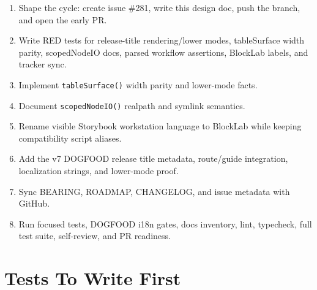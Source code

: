 \begin{enumerate}
\def\labelenumi{\arabic{enumi}.}
\tightlist
\item
  Shape the cycle: create issue \#281, write this design doc, push the branch, and open the early PR.
\item
  Write RED tests for release-title rendering/lower modes, tableSurface width parity, scopedNodeIO docs, parsed workflow assertions, BlockLab labels, and tracker sync.
\item
  Implement \texttt{t\allowbreak{}a\allowbreak{}b\allowbreak{}l\allowbreak{}e\allowbreak{}S\allowbreak{}u\allowbreak{}r\allowbreak{}f\allowbreak{}a\allowbreak{}c\allowbreak{}e\allowbreak{}(\allowbreak{})} width parity and lower-mode facts.
\item
  Document \texttt{s\allowbreak{}c\allowbreak{}o\allowbreak{}p\allowbreak{}e\allowbreak{}d\allowbreak{}N\allowbreak{}o\allowbreak{}d\allowbreak{}e\allowbreak{}I\allowbreak{}O\allowbreak{}(\allowbreak{})} realpath and symlink semantics.
\item
  Rename visible Storybook workstation language to BlockLab while keeping compatibility script aliases.
\item
  Add the v7 DOGFOOD release title metadata, route/guide integration, localization strings, and lower-mode proof.
\item
  Sync BEARING, ROADMAP, CHANGELOG, and issue metadata with GitHub.
\item
  Run focused tests, DOGFOOD i18n gates, docs inventory, lint, typecheck, full test suite, self-review, and PR readiness.
\end{enumerate}

\section{Tests To Write First}\label{record-101-tests-to-write-first}


